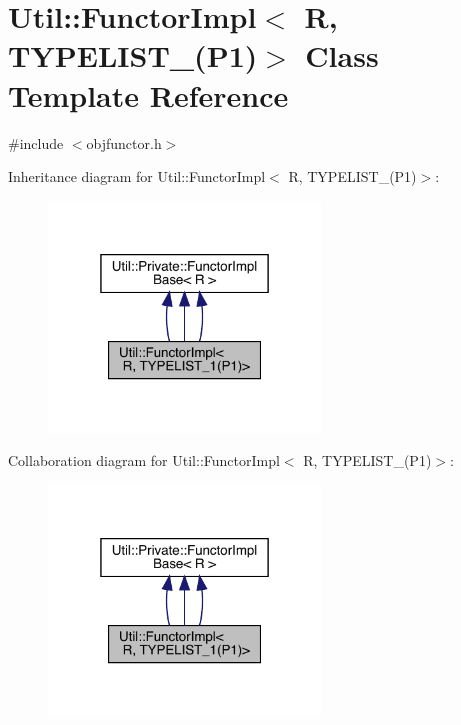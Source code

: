 \hypertarget{classUtil_1_1FunctorImpl_3_01R_00_01TYPELIST__1_07P1_08_4}{}\section{Util\+:\+:Functor\+Impl$<$ R, T\+Y\+P\+E\+L\+I\+S\+T\+\_(P1)$>$ Class Template Reference}
\label{classUtil_1_1FunctorImpl_3_01R_00_01TYPELIST__1_07P1_08_4}


{\ttfamily \#include $<$objfunctor.\+h$>$}



Inheritance diagram for Util\+:\+:Functor\+Impl$<$ R, T\+Y\+P\+E\+L\+I\+S\+T\+\_(P1)$>$\+:
\nopagebreak
\begin{figure}[H]
\begin{center}
\leavevmode
\includegraphics[width=205pt]{d4/d52/classUtil_1_1FunctorImpl_3_01R_00_01TYPELIST__1_07P1_08_4__inherit__graph}
\end{center}
\end{figure}


Collaboration diagram for Util\+:\+:Functor\+Impl$<$ R, T\+Y\+P\+E\+L\+I\+S\+T\+\_(P1)$>$\+:
\nopagebreak
\begin{figure}[H]
\begin{center}
\leavevmode
\includegraphics[width=205pt]{d0/d4a/classUtil_1_1FunctorImpl_3_01R_00_01TYPELIST__1_07P1_08_4__coll__graph}
\end{center}
\end{figure}
